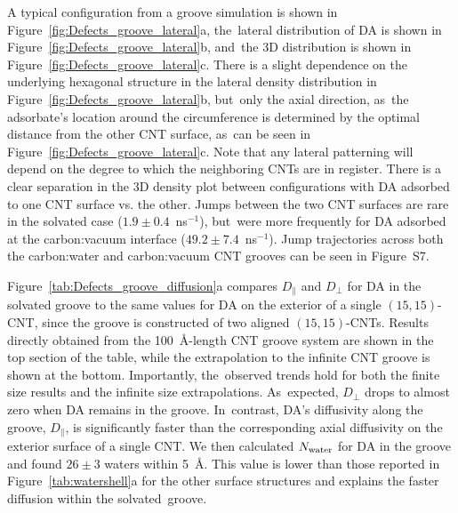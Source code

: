 \documentclass[molecules,article,accept,pdftex,moreauthors]{Definitions/mdpi}
\begin{document}
A typical configuration from a groove simulation is shown in Figure~\ref{fig:Defects_groove_lateral}a, the~lateral distribution of DA is shown in Figure~\ref{fig:Defects_groove_lateral}b, and~the 3D distribution is shown in Figure~\ref{fig:Defects_groove_lateral}c. There is a slight dependence on the underlying hexagonal structure in the lateral density distribution in Figure~\ref{fig:Defects_groove_lateral}b, but~only the axial direction, as~the adsorbate's location around the circumference is determined by the optimal distance from the other CNT surface, as~can be seen in Figure~\ref{fig:Defects_groove_lateral}c. Note that any lateral patterning will depend on the degree to which the neighboring CNTs are in register. There is a clear separation in the 3D density plot between configurations with DA adsorbed to one CNT surface vs. the other. Jumps between the two CNT surfaces are rare in the solvated case ($1.9\pm0.4$~ns$^{-1}$), but~were more frequently for DA adsorbed at the carbon:vacuum interface ($49.2\pm7.4$~ns$^{-1}$). Jump trajectories across both the carbon:water and carbon:vacuum CNT grooves can be seen in Figure~S7.



Figure~\ref{tab:Defects_groove_diffusion}a compares $D_{\parallel}$ and $D_{\perp}$ for DA in the solvated groove to the same values for DA on the exterior of a single $(15,15)$-CNT, since the groove is constructed of two aligned $(15,15)$-CNTs. Results directly obtained from the 100~\AA-length CNT groove system are shown in the top section of the table, while the extrapolation to the infinite CNT groove is shown at the bottom. Importantly, the~observed trends hold for both the finite size results and the infinite size extrapolations. As~expected, $D_{\perp}$ drops to almost zero when DA remains in the groove. In~contrast, DA's diffusivity along the groove, $D_{\parallel}$, is significantly faster than the corresponding axial diffusivity on the exterior surface of a single CNT. We then calculated $N_{\rm water}$ for DA in the groove and found $26\pm3$ waters within 5~\AA. This value is lower than those reported in Figure~\ref{tab:watershell}a for the other surface structures and explains the faster diffusion within the solvated~groove.
\end{document}
